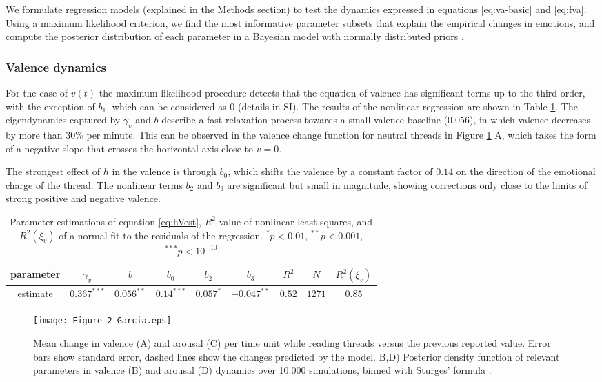 \documentclass[nologo,url,11pt,a4paper]{ETHpaper}
\begin{document}
We formulate regression models (explained in the Methods section) to test the dynamics expressed in equations \ref{eq:va-basic} and \ref{eq:fva}. Using a maximum likelihood criterion, we find the most informative parameter subsets that explain the empirical changes in emotions, and compute the posterior distribution of each parameter in a Bayesian model with normally distributed priors \cite{Gelman2008}.

\subsubsection{Valence dynamics}

For the case of $v(t)$ the maximum likelihood procedure detects that the
equation of valence has significant terms up to the third order, with the
exception of $b_1$, which can be considered as $0$ (details in SI).
The results of the nonlinear regression are shown in Table \ref{tab:VregAll}. The
eigendynamics captured by $\gamma_v$ and $b$ describe a
fast relaxation process towards a small valence baseline ($0.056$), in which
valence decreases by more than 30\% per minute. This can be observed in the
valence change function for neutral threads in Figure
\ref{fig:VReadingChanges} A, which takes the form of a negative slope that
crosses the horizontal axis close to $v=0$.

The strongest effect of $h$ in the valence
is through $b_0$, which shifts the valence by a constant factor of
$0.14$ on the direction of the emotional charge of the thread. The nonlinear
terms $b_2$ and $b_3$ are significant but small in
magnitude, showing  corrections only close to the limits of strong positive and
negative valence.

\begin{table}[h]
\centering
\begin{tabular}{ c | c  c  c  c  c| c  c c }
parameter 	& $\gamma_v$		& $b$   			& $b_0$  			& $b_2$   		& $b_3$  		  
& $R^2$  & $N$  & $R^2(\xi_v)$  \\ \hline 
estimate    & $0.367^{***}$	& $0.056^{**}$	& $0.14^{***}$ 	& $0.057^{*}$ & $-0.047^{**}$ & $0.52$ & $1271$ & $0.85$
\end{tabular}
\caption{Parameter estimations of equation \ref{eq:hVest}, $R^2$ value of
nonlinear least squares, and  $R^2(\xi_v)$ of a normal fit to the residuals of
the regression.    $^{*} p<0.01$, $^{**} p<0.001$,$^{***} p<10^{-10}$
\label{tab:VregAll}}
\end{table}

\begin{figure}[!ht]
\begin{center}
\texttt{[image: Figure-2-Garcia.eps]}
\end{center}
\caption{ Mean change in valence (A) and arousal (C) per time unit while reading threads versus the previous reported value. 
Error bars show standard error, dashed lines show the changes predicted by the model.
B,D) Posterior density function of relevant parameters in valence (B) and arousal (D) dynamics over 10.000 simulations, binned with Sturges' formula \cite{Sturges1926}. \label{fig:VReadingChanges} } \end{figure}
\end{document}
